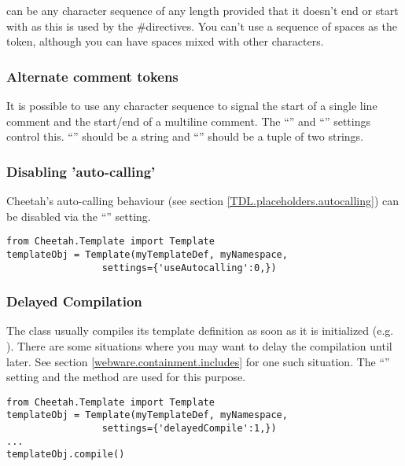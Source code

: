  can be any character sequence of any length
provided that it doesn't end or start with \code{\#} as this is used by the
\#directives.  You can't use a sequence of spaces as the token, although you can
have spaces mixed with other characters.

\subsubsection{Alternate comment tokens}

It is possible to use any character sequence to signal the start of a single
line comment and the start/end of a multiline comment.  The
``'' and ``'' settings control
this.  ``'' should be a string and
``'' should be a tuple of two strings.


\subsubsection{Disabling 'auto-calling'}

Cheetah's auto-calling behaviour (see section
\ref{TDL.placeholders.autocalling}) can be disabled via the
``'' setting.

\begin{verbatim}
from Cheetah.Template import Template
templateObj = Template(myTemplateDef, myNamespace, 
                 settings={'useAutocalling':0,})
\end{verbatim}


\subsubsection{Delayed Compilation}

The  class usually compiles its template
definition as soon as it is initialized (e.g. ).
There are some situations where you may want to delay the compilation until
later. See section \ref{webware.containment.includes} for one such situation.
The ``'' setting and the  method
are used for this purpose.

\begin{verbatim}
from Cheetah.Template import Template
templateObj = Template(myTemplateDef, myNamespace, 
                 settings={'delayedCompile':1,})
...
templateObj.compile()
\end{verbatim}

